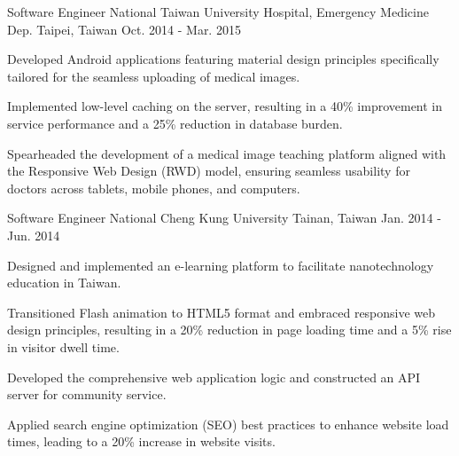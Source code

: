 \begin{cventries}
  \cventry
    {Software Engineer} %
    {National Taiwan University Hospital, Emergency Medicine Dep.} %
    {Taipei, Taiwan} %
    {Oct. 2014 - Mar. 2015} %
    {
      \begin{cvitems} %
        \item {Developed Android applications featuring material design principles specifically tailored for the seamless uploading of medical images.}
        \item {Implemented low-level caching on the server, resulting in a 40\% improvement in service performance and a 25\% reduction in database burden.}
        \item {Spearheaded the development of a medical image teaching platform aligned with the Responsive Web Design (RWD) model, ensuring seamless usability for doctors across tablets, mobile phones, and computers.}
      \end{cvitems}
    }

  \cventry
    {Software Engineer} %
    {National Cheng Kung University} %
    {Tainan, Taiwan} %
    {Jan. 2014 - Jun. 2014} %
    {
      \begin{cvitems} %
        \item {Designed and implemented an e-learning platform to facilitate nanotechnology education in Taiwan.}
        \item {Transitioned Flash animation to HTML5 format and embraced responsive web design principles, resulting in a 20\% reduction in page loading time and a 5\% rise in visitor dwell time.}
        \item {Developed the comprehensive web application logic and constructed an API server for community service.}
        \item {Applied search engine optimization (SEO) best practices to enhance website load times, leading to a 20\% increase in website visits.}
      \end{cvitems}
    }

\end{cventries}
